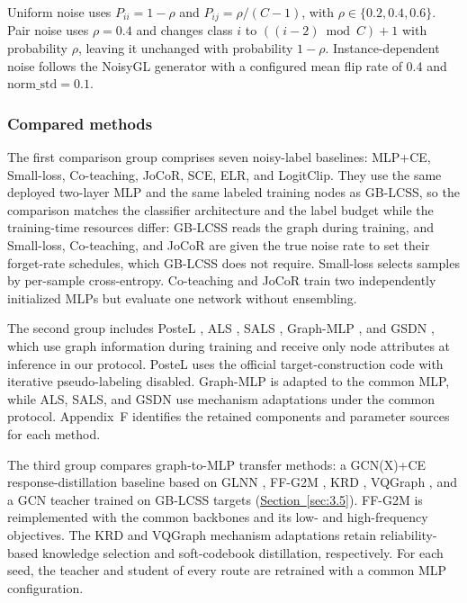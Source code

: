 \documentclass[10pt,letterpaper,nopreprintline]{elsarticle}
\theoremstyle{plain}
\begin{document}
Uniform noise uses \(P_{ii} = 1 - \rho\) and \(P_{ij} = \rho/(C - 1)\), with \(\rho \in \{ 0.2,0.4,0.6\}\). Pair noise uses \(\rho = 0.4\) and changes class \(i\) to \(((i - 2)\bmod C) + 1\) with probability \(\rho\), leaving it unchanged with probability \(1 - \rho\). Instance-dependent noise follows the NoisyGL generator with a configured mean flip rate of 0.4 and \(\text{norm\_std} = 0.1\).

\subsubsection{Compared methods}\label{sec:4.1.3}

The first comparison group comprises seven noisy-label baselines: MLP+CE, Small-loss, Co-teaching, JoCoR, SCE, ELR, and LogitClip. They use the same deployed two-layer MLP and the same labeled training nodes as GB-LCSS, so the comparison matches the classifier architecture and the label budget while the training-time resources differ: GB-LCSS reads the graph during training, and Small-loss, Co-teaching, and JoCoR are given the true noise rate to set their forget-rate schedules, which GB-LCSS does not require. Small-loss selects samples by per-sample cross-entropy. Co-teaching and JoCoR train two independently initialized MLPs but evaluate one network without ensembling.

The second group includes PosteL \cite{ref54}, ALS \cite{ref55}, SALS \cite{ref56}, Graph-MLP \cite{ref3}, and GSDN \cite{ref40}, which use graph information during training and receive only node attributes at inference in our protocol. PosteL uses the official target-construction code with iterative pseudo-labeling disabled. Graph-MLP is adapted to the common MLP, while ALS, SALS, and GSDN use mechanism adaptations under the common protocol. Appendix~F identifies the retained components and parameter sources for each method.

The third group compares graph-to-MLP transfer methods: a GCN(X)+CE response-distillation baseline based on GLNN \cite{ref4}, FF-G2M \cite{ref45}, KRD \cite{ref46}, VQGraph \cite{ref47}, and a GCN teacher trained on GB-LCSS targets (\hyperref[sec:3.5]{Section~\ref*{sec:3.5}}). FF-G2M is reimplemented with the common backbones and its low- and high-frequency objectives. The KRD and VQGraph mechanism adaptations retain reliability-based knowledge selection and soft-codebook distillation, respectively. For each seed, the teacher and student of every route are retrained with a common MLP configuration.
\end{document}
